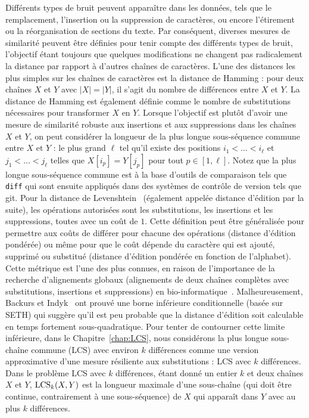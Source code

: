 Différents types de bruit peuvent apparaître dans les données, tels que le remplacement, l'insertion ou la suppression de caractères, ou encore l'étirement ou la réorganisation de sections du texte. Par conséquent, diverses mesures de similarité peuvent être définies pour tenir compte des différents types de bruit, l'objectif étant toujours que quelques modifications ne changent pas radicalement la distance par rapport à d'autres chaînes de caractères.
L'une des distances les plus simples sur les chaînes de caractères est la distance de Hamming : pour deux chaînes $X$ et $Y$ avec $|X|=|Y|$, il s'agit du nombre de différences entre $X$ et $Y$. La distance de Hamming est également définie comme le nombre de substitutions nécessaires pour transformer $X$ en $Y$.
Lorsque l'objectif est plutôt d'avoir une mesure de similarité robuste aux insertions et aux suppressions dans les chaînes $X$ et $Y$, on peut considérer la longueur de la plus longue sous-séquence commune entre $X$ et $Y$ : le plus grand $\ell$ tel qu'il existe des positions $i_1< ... < i_\ell$ et $j_1< ... < j_\ell$ telles que $X[i_p] = Y[j_p]$ pour tout $p \in [1,\ell]$. Notez que la plus longue sous-séquence commune est à la base d'outils de comparaison tels que \texttt{diff} qui sont ensuite appliqués dans des systèmes de contrôle de version tels que git.
Pour la distance de Levenshtein~\cite{levenshtein1966binary} (également appelée distance d'édition par la suite), les opérations autorisées sont les substitutions, les insertions et les suppressions, toutes avec un coût de $1$. Cette définition peut être généralisée pour permettre aux coûts de différer pour chacune des opérations (distance d'édition pondérée) ou même pour que le coût dépende du caractère qui est ajouté, supprimé ou substitué (distance d'édition pondérée en fonction de l'alphabet). Cette métrique est l'une des plus connues, en raison de l'importance de la recherche d'alignements globaux (alignements de deux chaînes complètes avec substitutions, insertions et suppressions) en bio-informatique~\cite{Gusfield1997}.
Malheureusement, Backurs et Indyk~\cite{DBLP:conf/stoc/BackursI15} ont prouvé une borne inférieure conditionnelle (basée sur SETH) qui suggère qu'il est peu probable que la distance d'édition soit calculable en temps fortement sous-quadratique.
Pour tenter de contourner cette limite inférieure, dans le Chapitre~\ref{chap:LCS}, nous considérons la plus longue sous-chaîne  commune (LCS) avec environ $k$ différences comme une version approximative d'une mesure résiliente aux substitutions : LCS avec $k$ différences. Dans le problème LCS avec $k$ différences, étant donné un entier $k$ et deux chaînes $X$ et $Y$, $\mathrm{LCS}_{k}(X,Y)$ est la longueur maximale d'une sous-chaîne (qui doit être continue, contrairement à une sous-séquence) de $X$ qui apparaît dans $Y$ avec au plus $k$ différences. 

